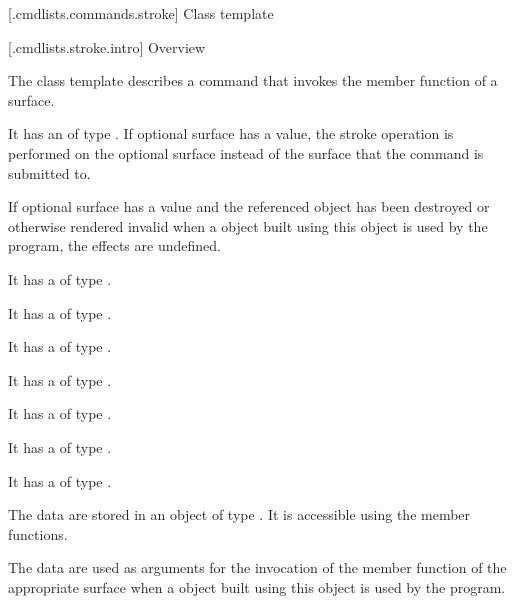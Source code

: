 
 [\iotwod.cmdlists.commands.stroke] {Class template }

 [\iotwod.cmdlists.stroke.intro] {Overview}

\pnum
{}%
The class template  describes a command that invokes the  member function of a surface.

\pnum
It has an  of type . If optional surface has a value, the stroke operation is performed on the optional surface instead of the surface that the command is submitted to.

\pnum
If optional surface has a value and the referenced  object has been destroyed or otherwise rendered invalid when a  object built using this  object is used by the program, the effects are undefined.

\pnum
It has a  of type .

\pnum
It has a  of type .

\pnum
It has a  of type .

\pnum
It has a  of type .

\pnum
It has a  of type .

\pnum
It has a  of type .

\pnum
It has a  of type .

\pnum
The data are stored in an object of type . It is accessible using the  member functions.

\pnum
The data are used as arguments for the invocation of the  member function of the appropriate surface when a  object built using this  object is used by the program.

